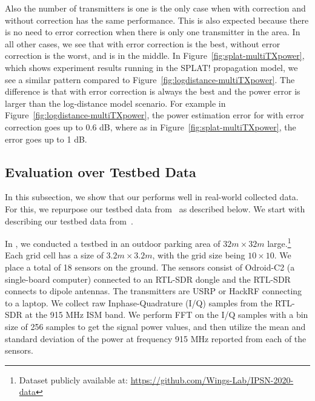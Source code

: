 Also the number of transmitters is one is the only case when \power with correction and without correction has the same performance.
This is also expected because there is no need to error correction when there is only one transmitter in the area.
In all other cases, we see that \power with error correction is the best, \power without error correction  is the worst, and \map is in the middle.
In Figure~\ref{fig:splat-multiTXpower}, which shows experiment results running in the SPLAT! propagation model, we see a similar pattern compared to Figure~\ref{fig:logdistance-multiTXpower}.
The difference is that \power with error correction is always the best and the power error is larger than the log-distance model scenario.
For example in Figure~\ref{fig:logdistance-multiTXpower}, the power estimation error for \power with error correction goes up to 0.6 dB, where as in Figure~\ref{fig:splat-multiTXpower}, the error goes up to 1 dB.







\subsection{\bf Evaluation over Testbed Data}
\label{subsec:ipsn}
In this subsection, we show that our \our performs well in real-world collected data.
For this, we repurpose our testbed data from~\cite{ipsn20-mtl} as described below. We start with describing our testbed data from~\cite{ipsn20-mtl}.

In \cite{ipsn20-mtl}, we conducted a testbed in an outdoor parking area of $32m\times 32m$ large.\footnote{Dataset publicly available at: \url{https://github.com/Wings-Lab/IPSN-2020-data}}
Each grid cell has a size of $3.2m \times 3.2m$, with the grid size being $10\times 10$.
We place a total of 18 sensors on the ground.
The sensors consist of Odroid-C2 (a single-board computer) connected to an RTL-SDR dongle and the RTL-SDR connects to dipole antennas.
The transmitters are USRP or HackRF connecting to a laptop.
We collect raw Inphase-Quadrature (I/Q) samples from the RTL-SDR at the 915 MHz ISM band.
We perform FFT on the I/Q samples with a bin size of 256 samples to get the signal power values, and then utilize the mean and standard deviation of the power at frequency 915 MHz reported from each of the sensors.

